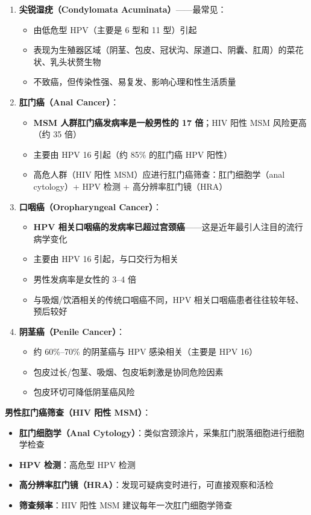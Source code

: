 \begin{enumerate}
	\item \textbf{尖锐湿疣（Condylomata Acuminata）}——最常见：
	\begin{itemize}
		\item 由低危型 HPV（主要是 6 型和 11 型）引起
		\item 表现为生殖器区域（阴茎、包皮、冠状沟、尿道口、阴囊、肛周）的菜花状、乳头状赘生物
		\item 不致癌，但传染性强、易复发、影响心理和性生活质量
	\end{itemize}

	\item \textbf{肛门癌（Anal Cancer）}：
	\begin{itemize}
		\item \textbf{MSM 人群肛门癌发病率是一般男性的 17 倍}；HIV 阳性 MSM 风险更高（约 35 倍）
		\item 主要由 HPV 16 引起（约 85\% 的肛门癌 HPV 阳性）
		\item 高危人群（HIV 阳性 MSM）应进行肛门癌筛查：肛门细胞学（anal cytology）+ HPV 检测 + 高分辨率肛门镜（HRA）
	\end{itemize}

	\item \textbf{口咽癌（Oropharyngeal Cancer）}：
	\begin{itemize}
		\item \textbf{HPV 相关口咽癌的发病率已超过宫颈癌}——这是近年最引人注目的流行病学变化
		\item 主要由 HPV 16 引起，与口交行为相关
		\item 男性发病率是女性的 3--4 倍
		\item 与吸烟/饮酒相关的传统口咽癌不同，HPV 相关口咽癌患者往往较年轻、预后较好
	\end{itemize}

	\item \textbf{阴茎癌（Penile Cancer）}：
	\begin{itemize}
		\item 约 60\%--70\% 的阴茎癌与 HPV 感染相关（主要是 HPV 16）
		\item 包皮过长/包茎、吸烟、包皮垢刺激是协同危险因素
		\item 包皮环切可降低阴茎癌风险
	\end{itemize}
\end{enumerate}

\vspace{0.5em}
\noindent\textbf{男性肛门癌筛查（HIV 阳性 MSM）}：

\begin{itemize}[leftmargin=2cm]
	\item \textbf{肛门细胞学（Anal Cytology）}：类似宫颈涂片，采集肛门脱落细胞进行细胞学检查
	\item \textbf{HPV 检测}：高危型 HPV 检测
	\item \textbf{高分辨率肛门镜（HRA）}：发现可疑病变时进行，可直接观察和活检
	\item \textbf{筛查频率}：HIV 阳性 MSM 建议每年一次肛门细胞学筛查
\end{itemize}

